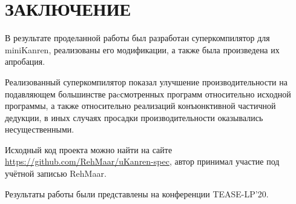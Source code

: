 \section*{ЗАКЛЮЧЕНИЕ}

В результате проделанной работы был разработан суперкомпилятор для miniKanren,
реализованы его модификации, а также была произведена их апробация.

Реализованный суперкомпилятор показал улучшение производительности на подавляющем
большинстве раcсмотренных программ относительно исходной программы, а также относительно
реализаций конъюнктивной частичной дедукции,
в иных случаях просадки производительности оказывались несущественными.

Исходный код проекта можно найти на сайте \url{https://github.com/RehMaar/uKanren-spec},
автор принимал участие под учётной записью RehMaar.

Результаты работы были представлены на конференции TEASE-LP'20.

